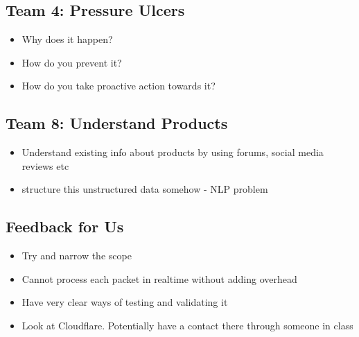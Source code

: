         \subsection{Team 4: Pressure Ulcers}
    \begin{itemize}
    		\item Why does it happen?
    		\item How do you prevent it?
    		\item How do you take proactive action towards it?
    \end{itemize}
    
        \subsection{Team 8: Understand Products}
    \begin{itemize}
    		\item Understand existing info about products by using forums, social media reviews etc
    		\item structure this unstructured data somehow - NLP problem
    \end{itemize}
    
    \subsection{Feedback for Us}
    \begin{itemize}
    		\item Try and narrow the scope
    		\item Cannot process each packet in realtime without adding overhead
    		\item Have very clear ways of testing and validating it
    		\item Look at Cloudflare. Potentially have a contact there through someone in class
    \end{itemize}